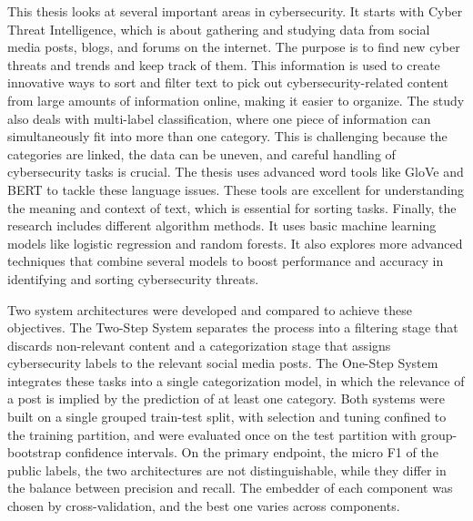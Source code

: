 This thesis looks at several important areas in cybersecurity. It starts with Cyber Threat Intelligence, which is about gathering and studying data from social media posts, blogs, and forums on the internet. The purpose is to find new cyber threats and trends and keep track of them. This information is used to create innovative ways to sort and filter text to pick out cybersecurity-related content from large amounts of information online, making it easier to organize. The study also deals with multi-label classification, where one piece of information can simultaneously fit into more than one category. This is challenging because the categories are linked, the data can be uneven, and careful handling of cybersecurity tasks is crucial. The thesis uses advanced word tools like GloVe and BERT to tackle these language issues. These tools are excellent for understanding the meaning and context of text, which is essential for sorting tasks. Finally, the research includes different algorithm methods. It uses basic machine learning models like logistic regression and random forests. It also explores more advanced techniques that combine several models to boost performance and accuracy in identifying and sorting cybersecurity threats.

Two system architectures were developed and compared to achieve these objectives. The Two-Step System separates the process into a filtering stage that discards non-relevant content and a categorization stage that assigns cybersecurity labels to the relevant social media posts. The One-Step System integrates these tasks into a single categorization model, in which the relevance of a post is implied by the prediction of at least one category. Both systems were built on a single grouped train-test split, with selection and tuning confined to the training partition, and were evaluated once on the test partition with group-bootstrap confidence intervals. On the primary endpoint, the micro F1 of the public labels, the two architectures are not distinguishable, while they differ in the balance between precision and recall. The embedder of each component was chosen by cross-validation, and the best one varies across components.

